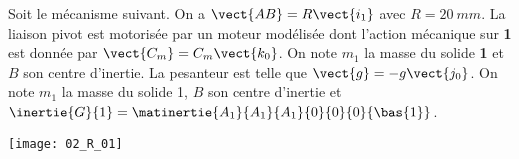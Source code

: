 \normaltrue
\correctionfalse


\setcounter{question}{0}%
\ifcorrection
\else
{}
\fi

\ifprof
\else
Soit le mécanisme suivant. On a $\vect{AB}=R\vect{i_1}$ avec $R=\SI{20}{mm}$. La liaison pivot est motorisée par un moteur modélisée dont l'action mécanique sur \textbf{1} est donnée par $\vect{C_m}=C_m \vect{k_0}$.
On note $m_1$ la masse du solide \textbf{1} et $B$ son centre d'inertie. 
 La pesanteur est telle que $\vect{g}=-g\vect{j_0}$.
On note $m_1$ la masse du solide 1, $B$ son centre d'inertie et $\inertie{G}{1}=\matinertie{A_1}{A_1}{A_1}{0}{0}{0}{\bas{1}}$.

\begin{marginfigure}
\texttt{[image: 02\_R\_01]}
\end{marginfigure}

\fi
{}
\ifprof
\else
\fi



\ifprof
\else


\fi